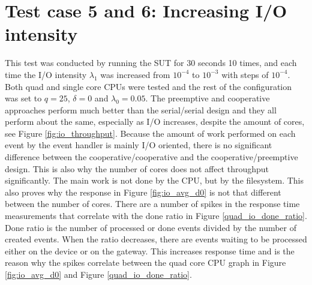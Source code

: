 
\section{Test case 5 and 6: Increasing I/O intensity}

This test was conducted by running the SUT for 30 seconds 10 times, and each
time the I/O intensity $\lambda_1$ was increased from $10^{-4}$ to $10^{-3}$
with steps of $10^{-4}$. Both quad and single core CPUs were tested and the
rest of the configuration was set to $q = 25$, $\delta = 0$ and $\lambda_0 =
0.05$. The preemptive and cooperative approaches perform much better than the
serial/serial design and they all perform about the same, especially as I/O
increases, despite the amount of cores, see Figure \ref{fig:io_throughput}.
Because the amount of work performed on each event by the event handler is
mainly I/O oriented, there is no significant difference between the
cooperative/cooperative and the cooperative/preemptive design. This is also why
the number of cores does not affect throughput significantly. The main work is
not done by the CPU, but by the filesystem. This also proves why the response
in Figure \ref{fig:io_avg_d0} is not that different between the number of
cores. There are a number of spikes in the response time measurements that
correlate with the done ratio in Figure \ref{quad_io_done_ratio}. Done ratio is
the number of processed or done events divided by the number of created events.
When the ratio decreases, there are events waiting to be processed either on
the device or on the gateway. This increases response time and is the reason
why the spikes correlate between the quad core CPU graph in Figure
\ref{fig:io_avg_d0} and Figure \ref{quad_io_done_ratio}.
